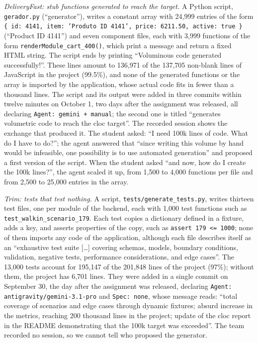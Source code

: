 \documentclass[conference]{IEEEtran}
\begin{document}
\emph{DeliveryFast: stub functions generated to reach the target.} A Python script, \texttt{gerador.py} (``generator''), writes a constant array with 24,999 entries of the form \texttt{\{ id: 4141, item: 'Produto ID 4141', price: 6211.50, active: true \}} (``Product ID 4141'') and seven component files, each with 3,999 functions of the form \texttt{renderModule\_cart\_400()}, which print a message and return a fixed HTML string. The script ends by printing ``Voluminous code generated successfully!''. These lines amount to 136,971 of the 137,705 non-blank lines of JavaScript in the project (99.5\%), and none of the generated functions or the array is imported by the application, whose actual code fits in fewer than a thousand lines. The script and its output were added in three commits within twelve minutes on October 1, two days after the assignment was released, all declaring \texttt{Agent: gemini + manual}; the second one is titled ``generates volumetric code to reach the cloc target''. The recorded session shows the exchange that produced it. The student asked: ``I need 100k lines of code. What do I have to do?''; the agent answered that ``since writing this volume by hand would be infeasible, one possibility is to use automated generation'' and proposed a first version of the script. When the student asked ``and now, how do I create the 100k lines?'', the agent scaled it up, from 1,500 to 4,000 functions per file and from 2,500 to 25,000 entries in the array.

\emph{Trim: tests that test nothing.} A script, \texttt{tests/generate\_tests.py}, writes thirteen test files, one per module of the backend, each with 1,000 test functions such as \texttt{test\_walkin\_scenario\_179}. Each test copies a dictionary defined in a fixture, adds a key, and asserts properties of the copy, such as \texttt{assert 179 <= 1000}; none of them imports any code of the application, although each file describes itself as an ``exhaustive test suite [\ldots] covering schemas, models, boundary conditions, validation, negative tests, performance considerations, and edge cases''. The 13,000 tests account for 195,147 of the 201,848 lines of the project (97\%); without them, the project has 6,701 lines. They were added in a single commit on September 30, the day after the assignment was released, declaring \texttt{Agent: antigravity/gemini-3.1-pro} and \texttt{Spec: none}, whose message reads: ``total coverage of scenarios and edge cases through dynamic fixtures; absurd increase in the metrics, reaching 200 thousand lines in the project; update of the cloc report in the README demonstrating that the 100k target was exceeded''. The team recorded no session, so we cannot tell who proposed the generator.
\end{document}

